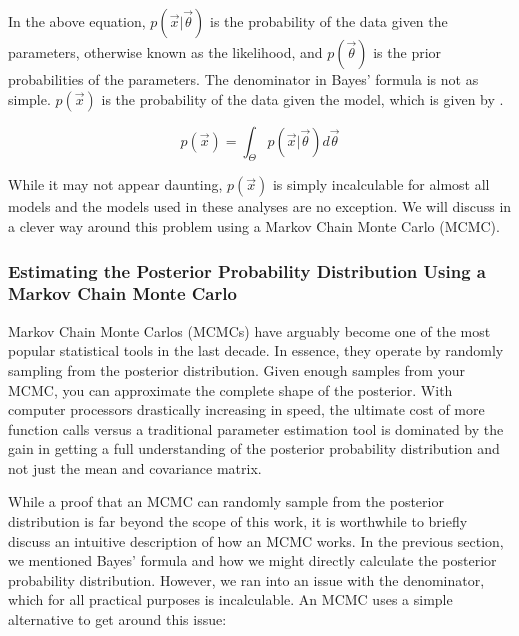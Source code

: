 In the above equation, $p(\vec{x}|\vec{\theta})$ is the probability of the data given the parameters, otherwise known as the likelihood, and $p(\vec{\theta})$ is the prior probabilities of the parameters.  The denominator in Bayes' formula is not as simple.  $p(\vec{x})$ is the probability of the data given the model, which is given by .


\begin{equation}
        \label{eqn:xe1t_px}
        p(\vec{x}) = \int_{\Theta} p(\vec{x}|\vec{\theta}) d\vec{\theta}
\end{equation}


While it may not appear daunting, $p(\vec{x})$ is simply incalculable for almost all models and the models used in these analyses are no exception.  We will discuss in  a clever way around this problem using a Markov Chain Monte Carlo (MCMC).




\subsubsection{Estimating the Posterior Probability Distribution Using a Markov Chain Monte Carlo}
\label{sec:xe1t_mcmc}


Markov Chain Monte Carlos (MCMCs) have arguably become one of the most popular statistical tools in the last decade.  In essence, they operate by randomly sampling from the posterior distribution.  Given enough samples from your MCMC, you can approximate the complete shape of the posterior.  With computer processors drastically increasing in speed, the ultimate cost of more function calls versus a traditional parameter estimation tool is dominated by the gain in getting a full understanding of the posterior probability distribution and not just the mean and covariance matrix.

While a proof that an MCMC can randomly sample from the posterior distribution is far beyond the scope of this work, it is worthwhile to briefly discuss an intuitive description of how an MCMC works.  In the previous section, we mentioned Bayes' formula and how we might directly calculate the posterior probability distribution.  However, we ran into an issue with the denominator, which for all practical purposes is incalculable.  An MCMC uses a simple alternative to get around this issue:  

